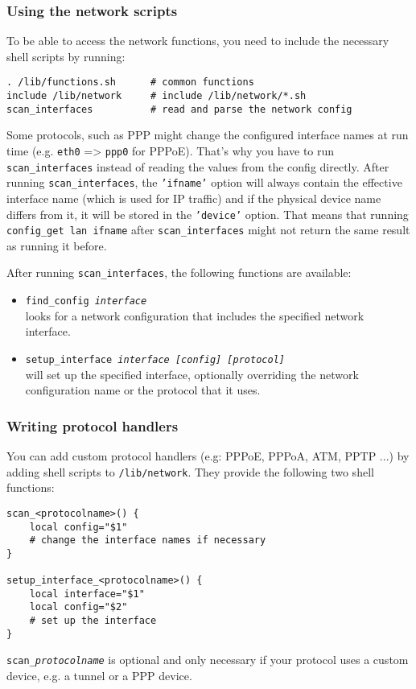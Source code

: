 \subsubsection{Using the network scripts}

To be able to access the network functions, you need to include
the necessary shell scripts by running:

\begin{Verbatim}
. /lib/functions.sh      # common functions
include /lib/network     # include /lib/network/*.sh
scan_interfaces          # read and parse the network config
\end{Verbatim}

Some protocols, such as PPP might change the configured interface names
at run time (e.g. \texttt{eth0} => \texttt{ppp0} for PPPoE). That's why you have to run
\texttt{scan\_interfaces} instead of reading the values from the config directly.
After running \texttt{scan\_interfaces}, the \texttt{'ifname'} option will always contain
the effective interface name (which is used for IP traffic) and if the
physical device name differs from it, it will be stored in the \texttt{'device'}
option.
That means that running \texttt{config\_get lan ifname}
after \texttt{scan\_interfaces} might not return the same result as running it before.

After running \texttt{scan\_interfaces}, the following functions are available:

\begin{itemize}
    \item{\texttt{find\_config \textit{interface}}} \\
        looks for a network configuration that includes
        the specified network interface.

    \item{\texttt{setup\_interface \textit{interface [config] [protocol]}}} \\
      will set up the specified interface, optionally overriding the network configuration
      name or the protocol that it uses.
\end{itemize}

\subsubsection{Writing protocol handlers}

You can add custom protocol handlers (e.g: PPPoE, PPPoA, ATM, PPTP ...)
by adding shell scripts to \texttt{/lib/network}. They provide the following
two shell functions:

\begin{Verbatim}
scan_<protocolname>() {
    local config="$1"
    # change the interface names if necessary
}

setup_interface_<protocolname>() {
    local interface="$1"
    local config="$2"
    # set up the interface
}
\end{Verbatim}

\texttt{scan\_\textit{protocolname}} is optional and only necessary if your protocol
uses a custom device, e.g. a tunnel or a PPP device.

